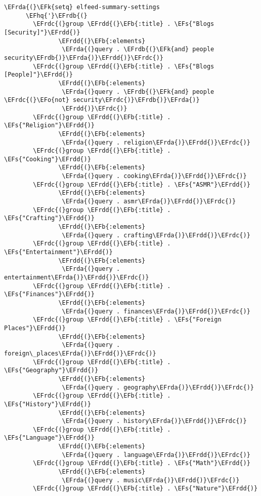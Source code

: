 \documentclass[a4wide,10pt]{article}
\newcommand{\EFs}[1]{\textcolor{EFs}{#1}} %
\newcommand{\EFk}[1]{\textcolor{EFk}{#1}} %
\newcommand{\EFb}[1]{\textcolor{EFb}{#1}} %
\newcommand{\EFo}[1]{\textcolor{EFo}{#1}} %
\newcommand{\EFhq}[1]{\textcolor{EFhq}{#1}} %
\newcommand{\EFrda}[1]{\textcolor{EFrda}{#1}} %
\newcommand{\EFrdb}[1]{\textcolor{EFrdb}{#1}} %
\newcommand{\EFrdc}[1]{\textcolor{EFrdc}{#1}} %
\newcommand{\EFrdd}[1]{\textcolor{EFrdd}{#1}} %
\begin{document}
\begin{Code}
\begin{Verbatim}
\EFrda{(}\EFk{setq} elfeed-summary-settings
      \EFhq{'}\EFrdb{(}
        \EFrdc{(}group \EFrdd{(}\EFb{:title} . \EFs{"Blogs [Security]"}\EFrdd{)}
               \EFrdd{(}\EFb{:elements}
                \EFrda{(}query . \EFrdb{(}\EFk{and} people security\EFrdb{)}\EFrda{)}\EFrdd{)}\EFrdc{)}
        \EFrdc{(}group \EFrdd{(}\EFb{:title} . \EFs{"Blogs [People]"}\EFrdd{)}
               \EFrdd{(}\EFb{:elements}
                \EFrda{(}query . \EFrdb{(}\EFk{and} people \EFrdc{(}\EFo{not} security\EFrdc{)}\EFrdb{)}\EFrda{)}
                \EFrdd{)}\EFrdc{)}
        \EFrdc{(}group \EFrdd{(}\EFb{:title} . \EFs{"Religion"}\EFrdd{)}
               \EFrdd{(}\EFb{:elements}
                \EFrda{(}query . religion\EFrda{)}\EFrdd{)}\EFrdc{)}
        \EFrdc{(}group \EFrdd{(}\EFb{:title} . \EFs{"Cooking"}\EFrdd{)}
               \EFrdd{(}\EFb{:elements}
                \EFrda{(}query . cooking\EFrda{)}\EFrdd{)}\EFrdc{)}
        \EFrdc{(}group \EFrdd{(}\EFb{:title} . \EFs{"ASMR"}\EFrdd{)}
               \EFrdd{(}\EFb{:elements}
                \EFrda{(}query . asmr\EFrda{)}\EFrdd{)}\EFrdc{)}
        \EFrdc{(}group \EFrdd{(}\EFb{:title} . \EFs{"Crafting"}\EFrdd{)}
               \EFrdd{(}\EFb{:elements}
                \EFrda{(}query . crafting\EFrda{)}\EFrdd{)}\EFrdc{)}
        \EFrdc{(}group \EFrdd{(}\EFb{:title} . \EFs{"Entertainment"}\EFrdd{)}
               \EFrdd{(}\EFb{:elements}
                \EFrda{(}query . entertainment\EFrda{)}\EFrdd{)}\EFrdc{)}
        \EFrdc{(}group \EFrdd{(}\EFb{:title} . \EFs{"Finances"}\EFrdd{)}
               \EFrdd{(}\EFb{:elements}
                \EFrda{(}query . finances\EFrda{)}\EFrdd{)}\EFrdc{)}
        \EFrdc{(}group \EFrdd{(}\EFb{:title} . \EFs{"Foreign Places"}\EFrdd{)}
               \EFrdd{(}\EFb{:elements}
                \EFrda{(}query . foreign\_places\EFrda{)}\EFrdd{)}\EFrdc{)}
        \EFrdc{(}group \EFrdd{(}\EFb{:title} . \EFs{"Geography"}\EFrdd{)}
               \EFrdd{(}\EFb{:elements}
                \EFrda{(}query . geography\EFrda{)}\EFrdd{)}\EFrdc{)}
        \EFrdc{(}group \EFrdd{(}\EFb{:title} . \EFs{"History"}\EFrdd{)}
               \EFrdd{(}\EFb{:elements}
                \EFrda{(}query . history\EFrda{)}\EFrdd{)}\EFrdc{)}
        \EFrdc{(}group \EFrdd{(}\EFb{:title} . \EFs{"Language"}\EFrdd{)}
               \EFrdd{(}\EFb{:elements}
                \EFrda{(}query . language\EFrda{)}\EFrdd{)}\EFrdc{)}
        \EFrdc{(}group \EFrdd{(}\EFb{:title} . \EFs{"Math"}\EFrdd{)}
               \EFrdd{(}\EFb{:elements}
                \EFrda{(}query . music\EFrda{)}\EFrdd{)}\EFrdc{)}
        \EFrdc{(}group \EFrdd{(}\EFb{:title} . \EFs{"Nature"}\EFrdd{)}

\end{Verbatim}
\end{Code}
\end{document}
